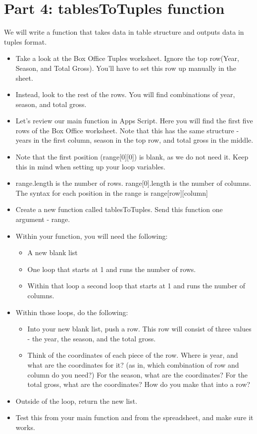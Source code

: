 \documentclass{article}
\begin{document}
\section*{Part 4: tablesToTuples function}
We will write a function that takes data in table structure and outputs data in tuples format.
\begin{itemize}
	\item Take a look at the Box Office Tuples worksheet.  Ignore the top row(Year, Season, and Total Gross).  You'll have to set this row up manually in the sheet.
	\item Instead, look to the rest of the rows.  You will find combinations of year, season, and total gross.
	\item Let's review our main function in Apps Script.  Here you will find the first five rows of the Box Office worksheet. Note that this has the same structure - years in the first column, season in the top row, and total gross in the middle. 
	\item Note that the first position (range[0][0]) is blank, as we  do not need it.  Keep this in mind when setting up your loop variables.
	\item range.length is the number of rows.  range[0].length is the number of columns.  The syntax for each position in the range is range[row][column]
	\item Create a new function called tablesToTuples.  Send this function one argument - range.
	\item Within your function, you will need the following:
	\begin{itemize}
		\item A new blank list
		\item One loop that starts at 1 and runs the number of rows.
		\item Within that loop a second loop that starts at 1 and runs the number of columns.
	\end{itemize}
	\item Within those loops, do the following:
	\begin{itemize}
		\item Into your new blank list, push a row.  This row will consist of three values - the year, the season, and the total gross.
		\item Think of the coordinates of each piece of the row.  Where is year, and what are the coordinates for it? (as in, which combination of row and column do you need?)  For the season, what are the coordinates?  For the total gross, what are the coordinates?  How do you make that into a row?
	\end{itemize}
	\item Outside of the loop, return the new list.
	\item Test this from your main function and from the spreadsheet, and make sure it works.
\end{itemize}
\end{document}

